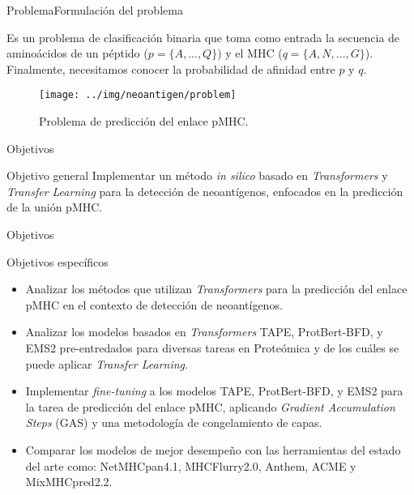 \documentclass[10pt]{beamer}
\newcommand{\1}{
	\setbeamertemplate{background}{
		\texttt{[image: img/1]}
		\tikz[overlay] \fill[fill opacity=0.75,fill=white] (0,0) rectangle (-\paperwidth,\paperheight);
	}
}
\begin{document}
\begin{frame}{Problema}{Formulación del problema}
	\begin{block}{}
		Es un problema de clasificación binaria que toma como entrada la secuencia de aminoácidos de un péptido ($p = \{A, ..., Q\}$) y el MHC ($q = \{A, N, ..., G\}$). Finalmente, necesitamos conocer la probabilidad de afinidad entre $p$ y $q$.
	\end{block}
	
	\begin{figure}
		\texttt{[image: ../img/neoantigen/problem]}
		\caption{Problema de predicción del enlace pMHC.}
	\end{figure}
\end{frame}


\begin{frame}{Objetivos}{}	
	\begin{block}{Objetivo general}
		Implementar un método \textit{in silico} basado en \textit{Transformers} y \textit{Transfer Learning} para la detección de neoantígenos, enfocados en la predicción de la unión pMHC. 
	\end{block}	

\end{frame}

\begin{frame}{Objetivos}{}	

	\begin{block}{Objetivos específicos}
		\begin{itemize} 
			\item Analizar los métodos que utilizan \textit{Transformers} para la predicción del enlace pMHC en el contexto de detección de neoantígenos. \pause
			\item Analizar los modelos basados en \textit{Transformers} TAPE, ProtBert-BFD, y EMS2 pre-entredados para diversas tareas en Proteómica y de los cuáles se puede aplicar \textit{Transfer Learning}. 	\pause
			\item Implementar \textit{fine-tuning} a los modelos TAPE, ProtBert-BFD, y EMS2 para la tarea de predicción del enlace pMHC, aplicando \textit{Gradient Accumulation Steps} (GAS) y una metodología de congelamiento de capas. \pause
			\item Comparar los modelos de mejor desempeño con las herramientas del estado del arte como: NetMHCpan4.1, MHCFlurry2.0, Anthem, ACME y MixMHCpred2.2.
		\end{itemize}
	\end{block}	
\end{frame}
\end{document}
